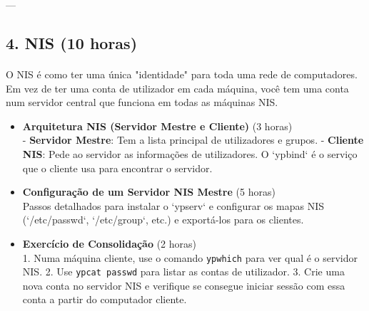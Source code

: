 \documentclass[10pt,a4paper]{article}
\newcommand{\guia}[1]{\textcolor{darkblue}{#1}} %
\begin{document}
	---
	
	\guia{
	}
	\subsection*{4. NIS (10 horas)}
	\vspace{-1.2em}
	\paragraph{}
	O NIS é como ter uma única "identidade" para toda uma rede de computadores. Em vez de ter uma conta de utilizador em cada máquina, você tem uma conta num servidor central que funciona em todas as máquinas NIS.
	
	\begin{itemize}
		\item \textbf{Arquitetura NIS (Servidor Mestre e Cliente)} (3 horas) \\
		- \textbf{Servidor Mestre}: Tem a lista principal de utilizadores e grupos.
		- \textbf{Cliente NIS}: Pede ao servidor as informações de utilizadores. O `ypbind` é o serviço que o cliente usa para encontrar o servidor.
		
		\item \textbf{Configuração de um Servidor NIS Mestre} (5 horas) \\
		Passos detalhados para instalar o `ypserv` e configurar os mapas NIS (`/etc/passwd`, `/etc/group`, etc.) e exportá-los para os clientes.
		
		\item \textbf{Exercício de Consolidação} (2 horas) \\
		1. Numa máquina cliente, use o comando \texttt{ypwhich} para ver qual é o servidor NIS.
		2. Use \texttt{ypcat passwd} para listar as contas de utilizador.
		3. Crie uma nova conta no servidor NIS e verifique se consegue iniciar sessão com essa conta a partir do computador cliente.
	\end{itemize}
	
\end{document}
